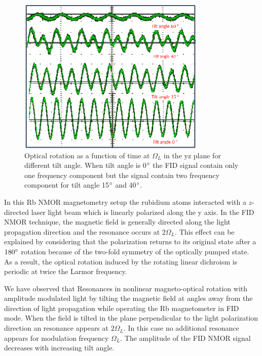 \begin{figure}
  \centering
\includegraphics[width=0.8\textwidth]{figures/tilted_field_scope_trace.png}
  \caption{Optical rotation as a function of time at $\Omega_L$ in the yz plane for different tilt angle. When tilt angle is 0$\degree$ the FID signal contain only one frequency component but the signal contain two frequency component for tilt angle 15$\degree$ and 40$\degree$.  \label{fig:optical-rotation-different-angle}}
    \label{fig:tilted}
\end{figure}
In this Rb NMOR magnetometry setup the rubidium atoms interacted with a $z$-directed laser light beam which is linearly polarized
along the y axis. In the FID NMOR technique, the magnetic field is generally directed along the light propagation direction and the resonance occurs at $2\Omega_L$.  This effect can be explained by considering that the polarization returns to its original state after a $180\degree$ rotation because of the two-fold symmetry of the optically pumped state. As a result, the optical rotation induced by the rotating linear dichroism is periodic at twice the Larmor frequency.

We have observed that Resonances in nonlinear magneto-optical rotation with amplitude modulated light by tilting the magnetic field at angles away from the direction of light propagation while operating the Rb magnetometer in FID mode. When the field is tilted in the plane perpendicular to the light polarization direction an resonance appears at $2\Omega_L$. In this case no additional resonance appears for modulation frequency $\Omega_L$. The amplitude of the FID NMOR signal decreases with increasing tilt angle. 

